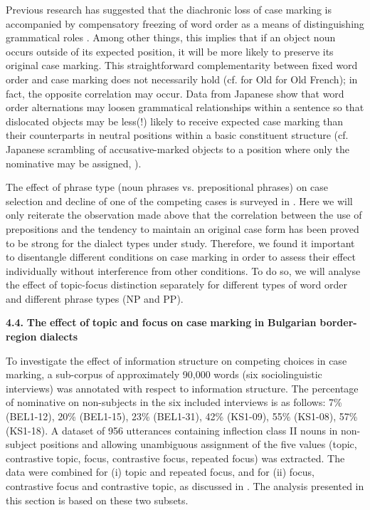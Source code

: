 \documentclass[output=paper]{langscibook}
\begin{document}
Previous research has suggested that the diachronic loss of case marking is accompanied by compensatory freezing of word order as a means of distinguishing grammatical roles \citep{Blake2004}. Among other things, this implies that if an object noun occurs outside of its expected position, it will be more likely to preserve its original case marking. This straightforward complementarity between fixed word order and case marking does not necessarily hold (cf. \citealt{Allen2006} for Old \citealt{EnglishDetges2009} for Old French); in fact, the opposite correlation may occur. Data from Japanese show that word order alternations may loosen grammatical relationships within a sentence so that dislocated objects may be less(!) likely to receive expected case marking than their counterparts in neutral positions within a basic constituent structure (cf. Japanese scrambling of accusative-marked objects to a position where only the nominative may be assigned, \citealt{Kasai2018}).

The effect of phrase type (noun phrases vs. prepositional phrases) on case selection and decline of one of the competing cases is surveyed in . Here we will only reiterate the observation made above that the correlation between the use of prepositions and the tendency to maintain an original case form has been proved to be strong for the dialect types under study. Therefore, we found it important to disentangle different conditions on case marking in order to assess their effect individually without interference from other conditions. To do so, we will analyse the effect of topic-focus distinction separately for different types of word order and different phrase types (NP and PP). 

\textbf{4.4.} \textbf{The} \textbf{effect} \textbf{of} \textbf{topic} \textbf{and} \textbf{focus} \textbf{on} \textbf{case} \textbf{marking} \textbf{in} \textbf{Bulgarian} \textbf{border-region} \textbf{dialects}

To investigate the effect of information structure on competing choices in case marking, a sub-corpus of approximately 90,000 words (six sociolinguistic interviews) was annotated with respect to information structure. The percentage of nominative on non-subjects in the six included interviews is as follows: 7\% (BEL1-12), 20\% (BEL1-15), 23\% (BEL1-31), 42\% (KS1-09), 55\% (KS1-08), 57\% (KS1-18).  A dataset of 956 utterances containing inflection class II nouns in non-subject positions and allowing unambiguous assignment of the five values (topic, contrastive topic, focus, contrastive focus, repeated focus) was extracted. The data were combined for (i) topic and repeated focus, and for (ii) focus, contrastive focus and contrastive topic, as discussed in . The analysis presented in this section is based on these two subsets. 
\end{document}
